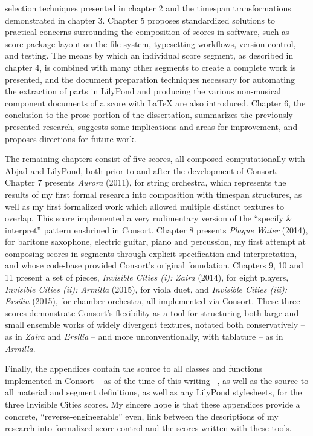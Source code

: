 selection techniques presented in chapter 2 and the timespan transformations
demonstrated in chapter 3. Chapter 5 proposes standardized solutions to
practical concerns surrounding the composition of scores in software, such as
score package layout on the file-system, typesetting workflows, version
control, and testing. The means by which an individual score segment, as
described in chapter 4, is combined with many other segments to create a
complete work is presented, and the document preparation techniques necessary
for automating the extraction of parts in LilyPond and producing the various
non-musical component documents of a score with \LaTeX{} are also introduced.
Chapter 6, the conclusion to the prose portion of the dissertation, summarizes
the previously presented research, suggests some implications and areas for
improvement, and proposes directions for future work.

The remaining chapters consist of five scores, all composed computationally
with Abjad and LilyPond, both prior to and after the development of Consort.
Chapter 7 presents \emph{Aurora} (2011), for string orchestra, which represents
the results of my first formal research into composition with timespan
structures, as well as my first formalized work which allowed multiple distinct
textures to overlap. This score implemented a very rudimentary version of the
\enquote{specify \& interpret} pattern enshrined in Consort. Chapter 8 presents
\emph{Plague Water} (2014), for baritone saxophone, electric guitar, piano and
percussion, my first attempt at composing scores in segments through explicit
specification and interpretation, and whose code-base provided Consort's
original foundation. Chapters 9, 10 and 11 present a set of pieces,
\emph{Invisible Cities (i): Zaira} (2014), for eight players, \emph{Invisible
Cities (ii): Armilla} (2015), for viola duet, and \emph{Invisible Cities (iii):
Ersilia} (2015), for chamber orchestra, all implemented via Consort. These
three scores demonstrate Consort's flexibility as a tool for structuring both
large and small ensemble works of widely divergent textures, notated both
conservatively -- as in \emph{Zaira} and \emph{Ersilia} -- and more
unconventionally, with tablature -- as in \emph{Armilla}.

Finally, the appendices contain the source to all classes and functions
implemented in Consort -- as of the time of this writing --, as well as the
source to all material and segment definitions, as well as any LilyPond
stylesheets, for the three Invisible Cities scores. My sincere hope is that
these appendices provide a concrete, \enquote{reverse-engineerable} even, link
between the descriptions of my research into formalized score control and the
scores written with these tools.


